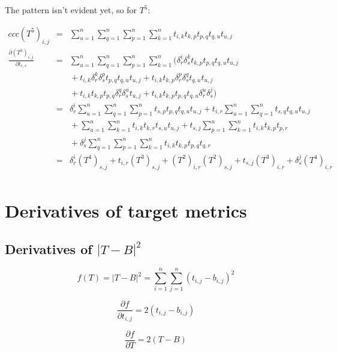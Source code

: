 \documentclass{report}
\begin{document}
The pattern isn't evident yet, so for $T^5$:

\begin{eqnarray}{ccc}
(T^5)_{i,j} &=& \sum_{u=1}^n \sum_{q=1}^n \sum_{p=1}^n \sum_{k=1}^n
t_{i,k} t_{k,p} t_{p,q} t_{q,u} t_{u,j} \\
\nonumber
\frac{\partial (T^5)_{i,j}}{\partial t_{r,s}} &=&
  \sum_{u=1}^n \sum_{q=1}^n \sum_{p=1}^n \sum_{k=1}^n (
  \delta^i_r \delta^k_s t_{k,p} t_{p,q} t_{q,u} t_{u,j} \\ \nonumber & & {} +
  t_{i,k} \delta^k_r \delta^p_s t_{p,q} t_{q,u} t_{u,j} +
  t_{i,k} t_{k,p} \delta^p_r \delta^q_s t_{q,u} t_{u,j} \\ & & {} +
  t_{i,k} t_{k,p} t_{p,q} \delta^q_r \delta^u_s t_{u,j} +
  t_{i,k} t_{k,p} t_{p,q} t_{q,u} \delta^u_r \delta^j_s )\\
\nonumber
&=& \delta^i_r \sum_{u=1}^n \sum_{q=1}^n \sum_{p=1}^n t_{s,p} t_{p,q} t_{q,u} t_{u,j}
 + t_{i,r} \sum_{u=1}^n \sum_{q=1}^n t_{s,q} t_{q,u} t_{u,j}
 \\ \nonumber & & {} + 
 \sum_{u=1}^n \sum_{k=1}^n t_{i,k} t_{k,r} t_{s,u} t_{u,j}
 + t_{s,j} \sum_{p=1}^n \sum_{k=1}^n t_{i,k} t_{k,p} t_{p,r}
 \\ & & {} + 
 \delta^j_s \sum_{q=1}^n \sum_{p=1}^n \sum_{k=1}^n t_{i,k} t_{k,p} t_{p,q} t_{q,r} \\
\nonumber
&=& \delta^i_r (T^4)_{s,j} + t_{i,r} (T^3)_{s,j} + (T^2)_{i,r}(T^2)_{s,j}
  + t_{s,j} (T^3)_{i,r} + \delta^j_s (T^4)_{i,r} \\
\end{eqnarray}


\chapter{Derivatives of target metrics}


\section{Derivatives of $|T-B|^2$}

\begin{equation}
f(T) = |T-B|^2 = \sum_{i=1}^n \sum_{j=1}^n (t_{i,j} - b_{i,j})^2
\end{equation}

\begin{equation}
\frac{\partial f}{\partial t_{i,j}} = 2 (t_{i,j} - b_{i,j})
\end{equation}

\begin{equation}
\frac{\partial f}{\partial T} = 2(T - B)
\end{equation}
\end{document}
